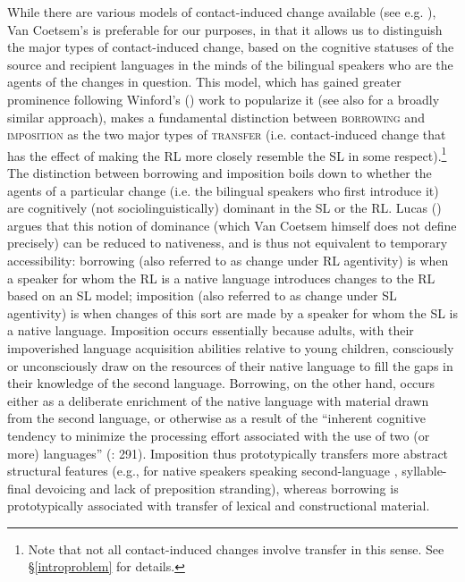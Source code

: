\documentclass[output=paper]{langsci/langscibook}
\begin{document}
While there are various models of contact-induced change available (see e.g. \citealt{ThomasonKaufman1988,Johanson2002,Matras2009}), Van Coetsem's is preferable for our purposes, in that it allows us to distinguish the major types of contact-induced change, based on the cognitive statuses of the source and recipient languages in the minds of the bilingual speakers who are the agents of the changes in question. This model, which has gained greater prominence following Winford's (\citeyear{Winford2005,Winford2007,Winford2010}) work to popularize it (see also \citealt{Ross2013} for a broadly similar approach), makes a fundamental distinction between \textsc{borrowing} and \textsc{imposition} as the two major types of \textsc{transfer} (i.e. contact-induced change that has the effect of making the {RL} more closely resemble the {SL} in some respect).\footnote{Note that not all contact-induced changes involve {transfer} in this sense. See §\ref{introproblem} for details.} The distinction between borrowing and {imposition} boils down to whether the agents of a particular change (i.e. the bilingual speakers who first introduce it) are cognitively (not sociolinguistically) dominant in the {SL} or the {RL}. Lucas (\citeyear{Lucas2012,Lucas2015}) argues that this notion of dominance (which Van Coetsem himself does not define precisely) can be reduced to nativeness, and is thus not equivalent to temporary accessibility: borrowing (also referred to as change under {RL} agentivity) is when a speaker for whom the {RL} is a native language introduces changes to the {RL} based on an {SL} model; {imposition} (also referred to as change under {SL} agentivity) is when changes of this sort are made by a speaker for whom the {SL} is a native language. Imposition occurs essentially because adults, with their impoverished language acquisition abilities {relative} to young children, consciously or unconsciously draw on the resources of their native language to fill the gaps in their knowledge of the second language. Borrowing, on the other hand, occurs either as a deliberate enrichment of the native language with material drawn from the second language, or otherwise as a result of the ``inherent cognitive tendency to minimize the processing effort associated with the use of two (or more) languages'' (\citealt{Lucas2012}: 291). Imposition thus prototypically transfers more abstract structural features (e.g., for  native speakers speaking second-language , syllable-final {devoicing} and lack of {preposition} stranding), whereas borrowing is prototypically associated with {transfer} of lexical and constructional material.
\end{document}
